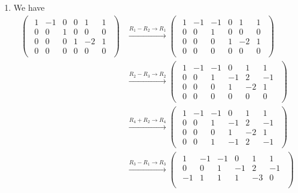 \documentclass[12pt]{article}
\begin{document}
\begin{enumerate}[label=\textbf{(\alph*)}]
    \itemsep 0em
    \item We have \begin{align*}
        \begin{pmatrix}
\begin{array}{ccccc|c}
1 & -1 & 0 & 0 & 1 & 1 \\
0 &  0 & 1 & 0 & 0 & 0 \\
0 &  0 & 0 & 1 & -2 & 1 \\
0 &  0 & 0 & 0 &  0 & 0
\end{array}
\end{pmatrix}&\xrightarrow{R_1-R_2\rightarrow R_1} \begin{pmatrix}
\begin{array}{ccccc|c}
1 & -1 & -1 & 0 & 1 & 1 \\
0 &  0 & 1 & 0 & 0 & 0 \\
0 &  0 & 0 & 1 & -2 & 1 \\
0 &  0 & 0 & 0 &  0 & 0
\end{array}
\end{pmatrix} \\
&\xrightarrow{R_2-R_3\rightarrow R_2} \begin{pmatrix}
\begin{array}{ccccc|c}
1 & -1 & -1 & 0 & 1 & 1 \\
0 &  0 & 1 & -1 & 2 & -1 \\
0 &  0 & 0 & 1 & -2 & 1 \\
0 &  0 & 0 & 0 &  0 & 0
\end{array}
\end{pmatrix} \\
&\xrightarrow{R_4 + R_2 \to R_4} \begin{pmatrix}
\begin{array}{ccccc|c}
1 & -1 & -1 & 0 & 1 & 1 \\
0 &  0 & 1 & -1 & 2 & -1 \\
0 &  0 & 0 & 1 & -2 & 1 \\
0 &  0 & 1 & -1 & 2 & -1
\end{array}
\end{pmatrix} \\
&\xrightarrow{R_3 - R_1 \to R_3} \begin{pmatrix}
\begin{array}{ccccc|c}
1 & -1 & -1 & 0 & 1 & 1 \\
0 &  0 & 1 & -1 & 2 & -1 \\
-1 & 1 & 1 & 1 & -3 & 0 \\

\end{array}
\end{pmatrix}
\end{align*}
\end{enumerate}
\end{document}
